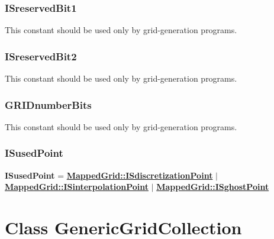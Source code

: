 \documentclass{article}
\begin{document}
  \subsubsection{ISreservedBit1}
  \label{MappedGrid::ISreservedBit1}
     This constant should be used only by grid-generation programs.

  \subsubsection{ISreservedBit2}
  \label{MappedGrid::ISreservedBit2}
     This constant should be used only by grid-generation programs.

  \subsubsection{GRIDnumberBits}
  \label{MappedGrid::GRIDnumberBits}
     This constant should be used only by grid-generation programs.

  \subsubsection{ISusedPoint}
  \label{MappedGrid::ISusedPoint}
    \textbf{ISusedPoint}
    =      {\bf{}\hyperref{ISdiscretizationPoint}{ISdiscretizationPoint \rm(\S}{)}{MappedGrid::ISdiscretizationPoint}}
    $\mid$ {\bf{}\hyperref{ISinterpolationPoint}{ISinterpolationPoint \rm(\S}{)}{MappedGrid::ISinterpolationPoint}}
    $\mid$ {\bf{}\hyperref{ISghostPoint}{ISghostPoint \rm(\S}{)}{MappedGrid::ISghostPoint}}


\section{Class GenericGridCollection} 
\label{GenericGridCollection}
\end{document}

